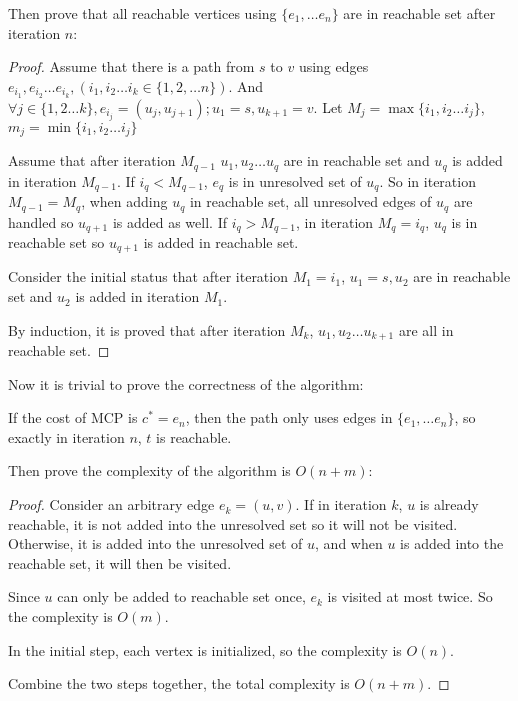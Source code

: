     \bigskip
    
    Then prove that all reachable vertices using $\{e_1,\dots e_n\}$ are in reachable set after iteration $n$: 
    \begin{proof}[Proof]
        Assume that there is a path from $s$ to $v$ using edges $e_{i_1},e_{i_2}\dots e_{i_k},(i_1,i_2\dots i_k\in \{1,2,\dots n\})$. 
        And $\forall j\in \{1,2\dots k\},e_{i_j}=(u_j,u_{j+1});u_1=s,u_{k+1}=v$. 
        Let $M_j=\max\{i_1,i_2\dots i_j\}$, $m_j=\min\{i_1,i_2\dots i_j\}$
        
        Assume that after iteration $M_{q-1}$ $u_1,u_2\dots u_q$ are in reachable set and $u_q$ is added in iteration $M_{q-1}$. 
        If $i_q<M_{q-1}$, $e_q$ is in unresolved set of $u_q$. 
        So in iteration $M_{q-1}=M_q$, when adding $u_q$ in reachable set, 
        all unresolved edges of $u_q$ are handled so $u_{q+1}$ is added as well. 
        If $i_q>M_{q-1}$, in iteration $M_q=i_q$, $u_q$ is in reachable set so $u_{q+1}$ is added in reachable set. 
        
        Consider the initial status that after iteration $M_1=i_1$, $u_1=s,u_2$ are in reachable set and $u_2$ is added in iteration $M_1$. 
        
        By induction, it is proved that after iteration $M_k$, $u_1,u_2\dots u_{k+1}$ are all in reachable set. 
    \end{proof}
    
    \bigskip
    
    
    Now it is trivial to prove the correctness of the algorithm: 
    
    If the cost of MCP is $c^*=e_n$, then the path only uses edges in $\{e_1,\dots e_n\}$, so exactly in iteration $n$, $t$ is reachable. 
    
    Then prove the complexity of the algorithm is $O(n+m)$:
    \begin{proof}[Proof]
        Consider an arbitrary edge $e_k=(u,v)$. If in iteration $k$, $u$ is already reachable, 
        it is not added into the unresolved set so it will not be visited. 
        Otherwise, it is added into the unresolved set of $u$, 
        and when $u$ is added into the reachable set, it will then be visited. 
        
        Since $u$ can only be added to reachable set once, $e_k$ is visited at most twice. So the complexity is $O(m)$.
        
        In the initial step, each vertex is initialized, so the complexity is $O(n)$. 
        
        Combine the two steps together, the total complexity is $O(n+m)$. 
    \end{proof} 

